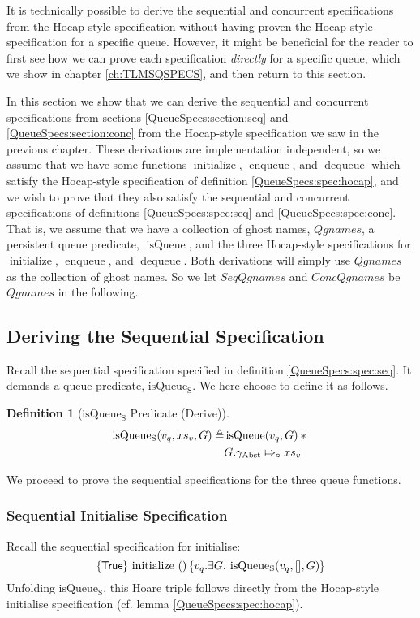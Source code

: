 \documentclass[a4paper, 10pt]{report}
\theoremstyle{definition}
\newtheorem{definition}{Definition}[section]
\newcommand{\initialise}{\operatorname{initialize}}
\newcommand{\enqueue}{\operatorname{enqueue}}
\newcommand{\dequeue}{\operatorname{dequeue}}
\newcommand{\isqueue}{\operatorname{isQueue}}
\newcommand{\isqueueseq}{\operatorname{isQueue_{S}}}
\newcommand{\SeqQgnames}{SeqQgnames}
\newcommand{\ConcQgnames}{ConcQgnames}
\newcommand{\Qgnames}{Qgnames}
\newcommand{\vq}{v_q}
\newcommand{\absvalueList}{xs_v}
\newcommand{\Qg}{G}
\newcommand{\gabst}{\gname_{\mathrm{Abst}}}
\newcommand{\abstractstatefullfrag}[2]{#1 \Mapsto_{\circ} #2}
\newcommand{\seqspecinitHTGen}[2]{\hoare{\TRUE}{\initialise \ \TT}{#1 . \Exists #2. \isqueueseq(#1, [], #2)}}
\newcommand{\seqspecinitGen}[2]{\seqspecinitHTGen{#1}{#2}}
\newcommand{\seqspecinit}{\seqspecinitGen{\vq}{\Qg}}
\begin{document}
It is technically possible to derive the sequential and concurrent specifications from the Hocap-style specification without having proven the Hocap-style specification for a specific queue. However, it might be beneficial for the reader to first see how we can prove each specification \textit{directly} for a specific queue, which we show in chapter \ref{ch:TLMSQSPECS}, and then return to this section.


In this section we show that we can derive the sequential and concurrent specifications from sections \ref{QueueSpecs:section:seq} and \ref{QueueSpecs:section:conc} from the Hocap-style specification we saw in the previous chapter. These derivations are implementation independent, so we assume that we have some functions $\initialise$, $\enqueue$, and $\dequeue$ which satisfy the Hocap-style specification of definition \ref{QueueSpecs:spec:hocap}, and we wish to prove that they also satisfy the sequential and concurrent specifications of definitions \ref{QueueSpecs:spec:seq} and \ref{QueueSpecs:spec:conc}. That is, we assume that we have a collection of ghost names, $\Qgnames$, a persistent queue predicate, $\isqueue$, and the three Hocap-style specifications for $\initialise$, $\enqueue$, and $\dequeue$. Both derivations will simply use $\Qgnames$ as the collection of ghost names. So we let $\SeqQgnames$ and $\ConcQgnames$ be $\Qgnames$ in the following.

\subsection{Deriving the Sequential Specification}
Recall the sequential specification specified in definition \ref{QueueSpecs:spec:seq}. It demands a queue predicate, $\isqueueseq$. We here choose to define it as follows.
\begin{definition}[$\isqueueseq$ Predicate (Derive)]\label{QueueSpecs:spec:seq:isqueueseq_derive}
\begin{align*}
  \isqueueseq(\vq, \absvalueList, \Qg) \eqdef
    &\isqueue(\vq, \Qg) \star{}\\
    &\abstractstatefullfrag{\Qg.\gabst}{\absvalueList}
\end{align*}
\end{definition}
We proceed to prove the sequential specifications for the three queue functions.

\subsubsection{Sequential Initialise Specification}
Recall the sequential specification for initialise:
\begin{equation*}
  \seqspecinit
\end{equation*}
Unfolding $\isqueueseq$, this Hoare triple follows directly from the Hocap-style initialise specification (cf. lemma \ref{QueueSpecs:spec:hocap}).
\end{document}
